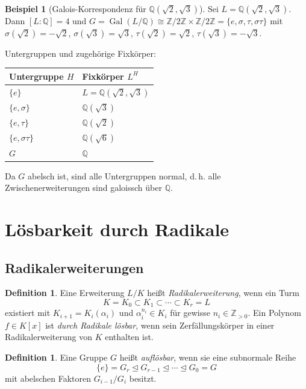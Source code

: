 \documentclass[12pt,a4paper]{amsart}
\theoremstyle{definition}
\newtheorem{definition}[theorem]{Definition}
\newtheorem{beispiel}[theorem]{Beispiel}
\newcommand{\Q}{\mathbb{Q}}
\newcommand{\Z}{\mathbb{Z}}
\newcommand{\Gal}{\operatorname{Gal}}
\begin{document}
\begin{beispiel}[Galois-Korrespondenz für $\Q(\sqrt{2},\sqrt{3})$]
Sei $L = \Q(\sqrt{2},\sqrt{3})$. Dann $[L:\Q] = 4$ und
$G = \Gal(L/\Q) \cong \Z/2\Z \times \Z/2\Z = \{e, \sigma, \tau, \sigma\tau\}$
mit $\sigma(\sqrt{2}) = -\sqrt{2}$, $\sigma(\sqrt{3}) = \sqrt{3}$,
$\tau(\sqrt{2}) = \sqrt{2}$, $\tau(\sqrt{3}) = -\sqrt{3}$.

Untergruppen und zugehörige Fixkörper:
\begin{center}
\begin{tabular}{ll}
\toprule
Untergruppe $H$ & Fixkörper $L^H$ \\
\midrule
$\{e\}$ & $L = \Q(\sqrt{2},\sqrt{3})$ \\
$\{e, \sigma\}$ & $\Q(\sqrt{3})$ \\
$\{e, \tau\}$ & $\Q(\sqrt{2})$ \\
$\{e, \sigma\tau\}$ & $\Q(\sqrt{6})$ \\
$G$ & $\Q$ \\
\bottomrule
\end{tabular}
\end{center}
Da $G$ abelsch ist, sind alle Untergruppen normal, d.\,h. alle
Zwischenerweiterungen sind galoissch über $\Q$.
\end{beispiel}

\section{Lösbarkeit durch Radikale}

\subsection{Radikalerweiterungen}

\begin{definition}
Eine Erweiterung $L/K$ heißt \emph{Radikalerweiterung}, wenn ein Turm
\[
  K = K_0 \subset K_1 \subset \cdots \subset K_r = L
\]
existiert mit $K_{i+1} = K_i(\alpha_i)$ und $\alpha_i^{n_i} \in K_i$ für
gewisse $n_i \in \Z_{>0}$. Ein Polynom $f \in K[x]$ ist \emph{durch Radikale
lösbar}, wenn sein Zerfällungskörper in einer Radikalerweiterung von $K$
enthalten ist.
\end{definition}

\begin{definition}
Eine Gruppe $G$ heißt \emph{auflösbar}, wenn sie eine subnormale Reihe
\[
  \{e\} = G_r \trianglelefteq G_{r-1} \trianglelefteq \cdots \trianglelefteq G_0 = G
\]
mit abelschen Faktoren $G_{i-1}/G_i$ besitzt.
\end{definition}
\end{document}
